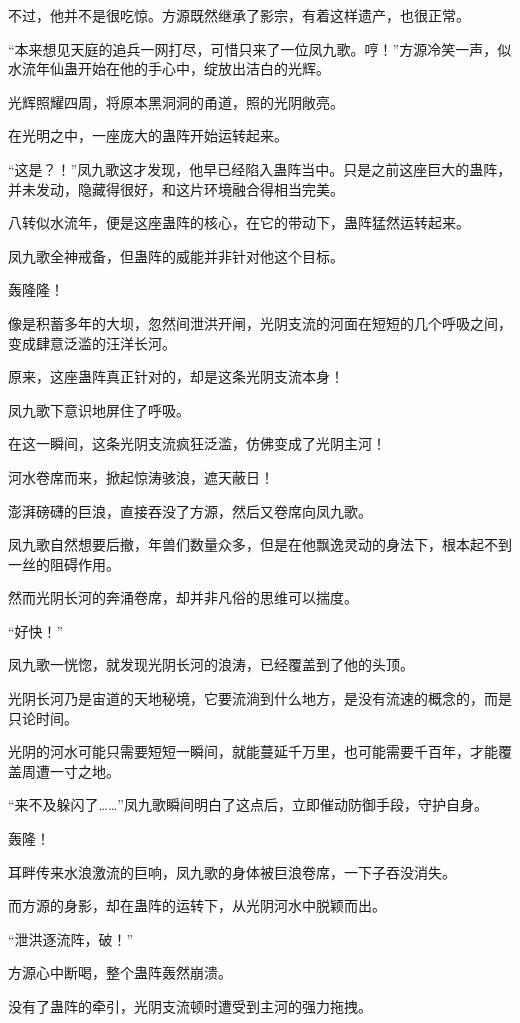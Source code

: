 \begin{this_body}
不过，他并不是很吃惊。方源既然继承了影宗，有着这样遗产，也很正常。

“本来想见天庭的追兵一网打尽，可惜只来了一位凤九歌。哼！”方源冷笑一声，似水流年仙蛊开始在他的手心中，绽放出洁白的光辉。

光辉照耀四周，将原本黑洞洞的甬道，照的光阴敞亮。

在光明之中，一座庞大的蛊阵开始运转起来。

“这是？！”凤九歌这才发现，他早已经陷入蛊阵当中。只是之前这座巨大的蛊阵，并未发动，隐藏得很好，和这片环境融合得相当完美。

八转似水流年，便是这座蛊阵的核心，在它的带动下，蛊阵猛然运转起来。

凤九歌全神戒备，但蛊阵的威能并非针对他这个目标。

轰隆隆！

像是积蓄多年的大坝，忽然间泄洪开闸，光阴支流的河面在短短的几个呼吸之间，变成肆意泛滥的汪洋长河。

原来，这座蛊阵真正针对的，却是这条光阴支流本身！

凤九歌下意识地屏住了呼吸。

在这一瞬间，这条光阴支流疯狂泛滥，仿佛变成了光阴主河！

河水卷席而来，掀起惊涛骇浪，遮天蔽日！

澎湃磅礴的巨浪，直接吞没了方源，然后又卷席向凤九歌。

凤九歌自然想要后撤，年兽们数量众多，但是在他飘逸灵动的身法下，根本起不到一丝的阻碍作用。

然而光阴长河的奔涌卷席，却并非凡俗的思维可以揣度。

“好快！”

凤九歌一恍惚，就发现光阴长河的浪涛，已经覆盖到了他的头顶。

光阴长河乃是宙道的天地秘境，它要流淌到什么地方，是没有流速的概念的，而是只论时间。

光阴的河水可能只需要短短一瞬间，就能蔓延千万里，也可能需要千百年，才能覆盖周遭一寸之地。

“来不及躲闪了……”凤九歌瞬间明白了这点后，立即催动防御手段，守护自身。

轰隆！

耳畔传来水浪激流的巨响，凤九歌的身体被巨浪卷席，一下子吞没消失。

而方源的身影，却在蛊阵的运转下，从光阴河水中脱颖而出。

“泄洪逐流阵，破！”

方源心中断喝，整个蛊阵轰然崩溃。

没有了蛊阵的牵引，光阴支流顿时遭受到主河的强力拖拽。


\end{this_body}
